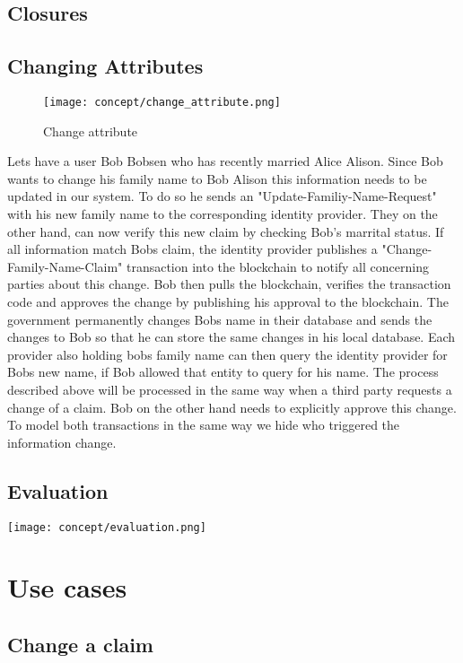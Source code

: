 \subsection{Closures}
\begin{comment}
\begin{figure}[ht]
\centering
\texttt{[image: concept/closure.png]}
\caption{Closure}
\label{fig:closure}
\end{figure}
\end{comment}

\subsection{Changing Attributes}

\begin{figure}[ht]
\centering
\texttt{[image: concept/change\_attribute.png]}
\caption{Change attribute}
\label{fig:change_attribute}
\end{figure}


Lets have a user Bob Bobsen who has recently married Alice Alison. Since Bob wants to change his family name to Bob Alison this information needs to be updated in our system. To do so he sends an "Update-Familiy-Name-Request" with his new family name to the corresponding identity provider. They on the other hand, can now verify this new claim by checking Bob's marrital status. If all information match Bobs claim, the identity provider publishes a "Change-Family-Name-Claim" transaction into the blockchain to notify all concerning parties about this change. 
Bob then pulls the blockchain, verifies the transaction code and approves the change by publishing his approval to the blockchain. The government permanently changes Bobs name in their database and sends the changes to Bob so that he can store the same changes in his local database. 
Each provider also holding bobs family name can then query the identity provider for Bobs new name, if Bob allowed that entity to query for his name.
The process described above will be processed in the same way when a third party requests a change of a claim. Bob on the other hand needs to explicitly approve this change. To model both transactions in the same way we hide who triggered the information change.

\subsection{Evaluation}

\texttt{[image: concept/evaluation.png]}
 
\section{Use cases}

\subsection{Change a claim}
